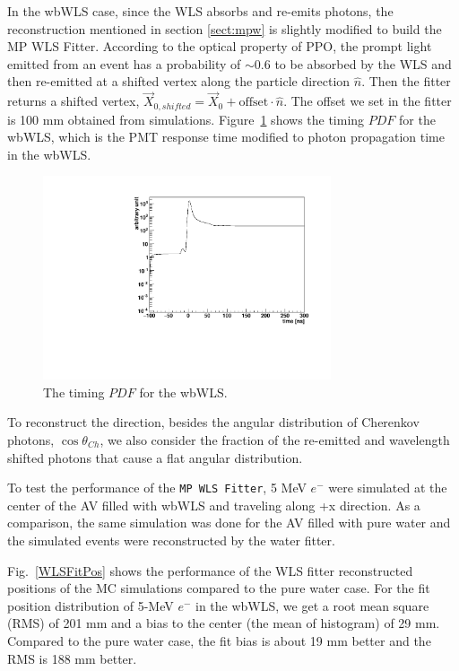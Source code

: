 In the wbWLS case, since the WLS absorbs and re-emits photons, the reconstruction mentioned in section \ref{sect:mpw} is slightly modified to build the MP WLS Fitter. According to the optical property of PPO, the prompt light emitted from an event has a probability of $\sim$0.6 to be absorbed by the WLS and then re-emitted at a shifted vertex along the particle direction $\hat{n}$. Then the fitter returns a shifted vertex, $\vec{X}_{0,shifted}=\vec{X}_0+\mathrm{offset}\cdot\hat{n}$. The offset we set in the fitter is 100 mm obtained from simulations. Figure~\ref{WLS_pdf} shows the timing $PDF$ for the wbWLS, which is the PMT response time modified to photon propagation time in the wbWLS.
\begin{figure}[htbp]	
	\centering		
	\begin{minipage}[b]{0.5\textwidth}			
		\includegraphics[height=6cm]{WLSTime_pdf.pdf}			
	\end{minipage}%
	\caption{\label{WLS_pdf} The timing $PDF$ for the wbWLS.}	
\end{figure}

To reconstruct the direction, besides the angular distribution of Cherenkov photons, $\cos\theta_{Ch}$, we also consider the fraction of the re-emitted and wavelength shifted photons that cause a flat angular distribution.

To test the performance of the \texttt{MP WLS Fitter}, 5 MeV $e^-$ were simulated at the center of the AV filled with wbWLS and traveling along +x direction. As a comparison, the same simulation was done for the AV filled with pure water and the simulated events were reconstructed by the water fitter.

Fig.~\ref{WLSFitPos} shows the performance of the WLS fitter reconstructed positions of the MC simulations compared to the pure water case. For the fit position distribution of 5-MeV $e^-$ in the wbWLS, we get a root mean square (RMS) of 201 mm and a bias to the center (the mean of histogram) of 29 mm. Compared to the pure water case, the fit bias is about 19 mm better and the RMS is 188 mm better.

